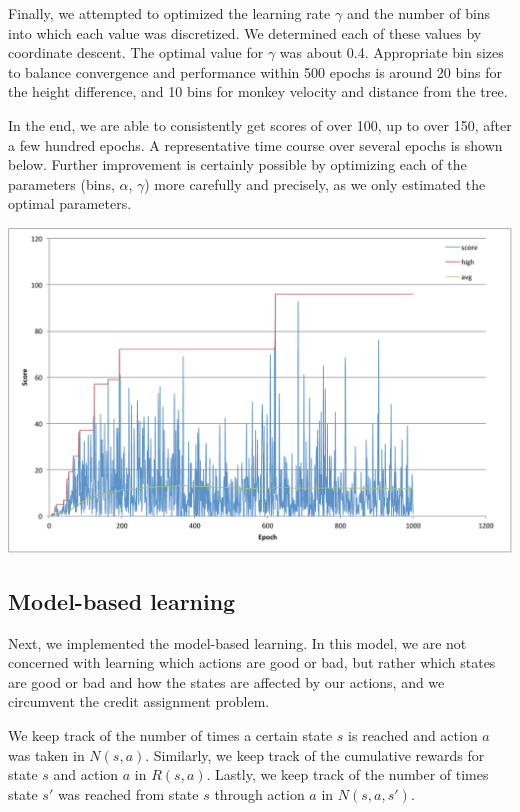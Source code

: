 \documentclass[11pt]{amsart}
\begin{document}
Finally, we attempted to optimized the learning rate $\gamma$ and the number of bins into which each value was discretized. We determined each of these values by coordinate descent. The optimal value for $\gamma$ was about 0.4.  Appropriate bin sizes to balance convergence and performance within 500 epochs is around 20 bins for the height difference, and 10 bins for monkey velocity and distance from the tree.

In the end, we are able to consistently get scores of over 100, up to over 150, after a few hundred epochs. A representative time course over several epochs is shown below. Further improvement is certainly possible by optimizing each of the parameters (bins, $\alpha$, $\gamma$) more carefully and precisely, as we only estimated the optimal parameters.

\includegraphics[width=\textwidth]{scores_model_free.pdf}

\subsection{Model-based learning}

Next, we implemented the model-based learning. In this model, we are not concerned with learning which actions are good or bad, but rather which states are good or bad and how the states are affected by our actions, and we circumvent the credit assignment problem. 

We keep track of the number of times a certain state $s$ is reached and action $a$ was taken in $N(s,a)$. Similarly, we keep track of the cumulative rewards for state $s$ and action $a$ in $R(s,a)$. Lastly, we keep track of the number of times state $s'$ was reached from state $s$ through action $a$ in $N(s,a,s')$. 
\end{document}
